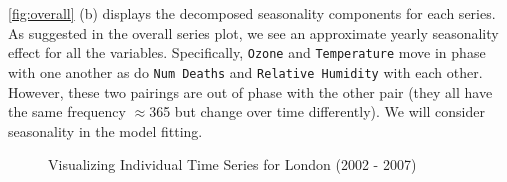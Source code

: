 \documentclass{article}\usepackage[]{graphicx}\usepackage[]{color}
\newenvironment{knitrout}{}{} %
\begin{document}
\autoref{fig:overall} (b) displays the decomposed seasonality components for each series. As suggested in the overall series plot, we see an approximate yearly seasonality effect for all the variables. Specifically, \texttt{Ozone} and \texttt{Temperature} move in phase with one another as do \texttt{Num Deaths} and \texttt{Relative Humidity} with each other. However, these two pairings are out of phase with the other pair (they all have the same frequency $\approx$365 but change over time differently). We will consider seasonality in the model fitting.

\begin{knitrout}
\color{fgcolor}\begin{figure}[H]

{\centering {}

}

\caption[Visualizing Individual Time Series for London (2002 - 2007)]{Visualizing Individual Time Series for London (2002 - 2007)}\label{fig:overall}
\end{figure}


\end{knitrout}
\end{document}
